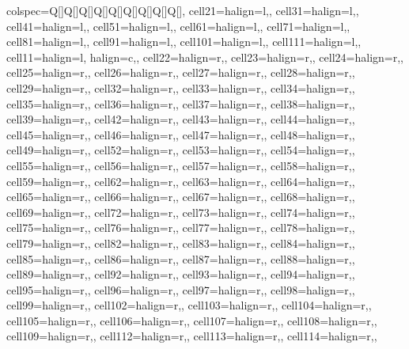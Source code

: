 \begin{table}
\centering
\begin{talltblr}[         %
caption={Descrptive statistics for all control (no treatment) sample},
]                     %
{                     %
colspec={Q[]Q[]Q[]Q[]Q[]Q[]Q[]Q[]Q[]},
cell{2}{1}={}{halign=l,},
cell{3}{1}={}{halign=l,},
cell{4}{1}={}{halign=l,},
cell{5}{1}={}{halign=l,},
cell{6}{1}={}{halign=l,},
cell{7}{1}={}{halign=l,},
cell{8}{1}={}{halign=l,},
cell{9}{1}={}{halign=l,},
cell{10}{1}={}{halign=l,},
cell{11}{1}={}{halign=l,},
cell{1}{1}={}{halign=l, halign=c,},
cell{2}{2}={}{halign=r,},
cell{2}{3}={}{halign=r,},
cell{2}{4}={}{halign=r,},
cell{2}{5}={}{halign=r,},
cell{2}{6}={}{halign=r,},
cell{2}{7}={}{halign=r,},
cell{2}{8}={}{halign=r,},
cell{2}{9}={}{halign=r,},
cell{3}{2}={}{halign=r,},
cell{3}{3}={}{halign=r,},
cell{3}{4}={}{halign=r,},
cell{3}{5}={}{halign=r,},
cell{3}{6}={}{halign=r,},
cell{3}{7}={}{halign=r,},
cell{3}{8}={}{halign=r,},
cell{3}{9}={}{halign=r,},
cell{4}{2}={}{halign=r,},
cell{4}{3}={}{halign=r,},
cell{4}{4}={}{halign=r,},
cell{4}{5}={}{halign=r,},
cell{4}{6}={}{halign=r,},
cell{4}{7}={}{halign=r,},
cell{4}{8}={}{halign=r,},
cell{4}{9}={}{halign=r,},
cell{5}{2}={}{halign=r,},
cell{5}{3}={}{halign=r,},
cell{5}{4}={}{halign=r,},
cell{5}{5}={}{halign=r,},
cell{5}{6}={}{halign=r,},
cell{5}{7}={}{halign=r,},
cell{5}{8}={}{halign=r,},
cell{5}{9}={}{halign=r,},
cell{6}{2}={}{halign=r,},
cell{6}{3}={}{halign=r,},
cell{6}{4}={}{halign=r,},
cell{6}{5}={}{halign=r,},
cell{6}{6}={}{halign=r,},
cell{6}{7}={}{halign=r,},
cell{6}{8}={}{halign=r,},
cell{6}{9}={}{halign=r,},
cell{7}{2}={}{halign=r,},
cell{7}{3}={}{halign=r,},
cell{7}{4}={}{halign=r,},
cell{7}{5}={}{halign=r,},
cell{7}{6}={}{halign=r,},
cell{7}{7}={}{halign=r,},
cell{7}{8}={}{halign=r,},
cell{7}{9}={}{halign=r,},
cell{8}{2}={}{halign=r,},
cell{8}{3}={}{halign=r,},
cell{8}{4}={}{halign=r,},
cell{8}{5}={}{halign=r,},
cell{8}{6}={}{halign=r,},
cell{8}{7}={}{halign=r,},
cell{8}{8}={}{halign=r,},
cell{8}{9}={}{halign=r,},
cell{9}{2}={}{halign=r,},
cell{9}{3}={}{halign=r,},
cell{9}{4}={}{halign=r,},
cell{9}{5}={}{halign=r,},
cell{9}{6}={}{halign=r,},
cell{9}{7}={}{halign=r,},
cell{9}{8}={}{halign=r,},
cell{9}{9}={}{halign=r,},
cell{10}{2}={}{halign=r,},
cell{10}{3}={}{halign=r,},
cell{10}{4}={}{halign=r,},
cell{10}{5}={}{halign=r,},
cell{10}{6}={}{halign=r,},
cell{10}{7}={}{halign=r,},
cell{10}{8}={}{halign=r,},
cell{10}{9}={}{halign=r,},
cell{11}{2}={}{halign=r,},
cell{11}{3}={}{halign=r,},
cell{11}{4}={}{halign=r,},
}
\end{talltblr}
\end{table}
